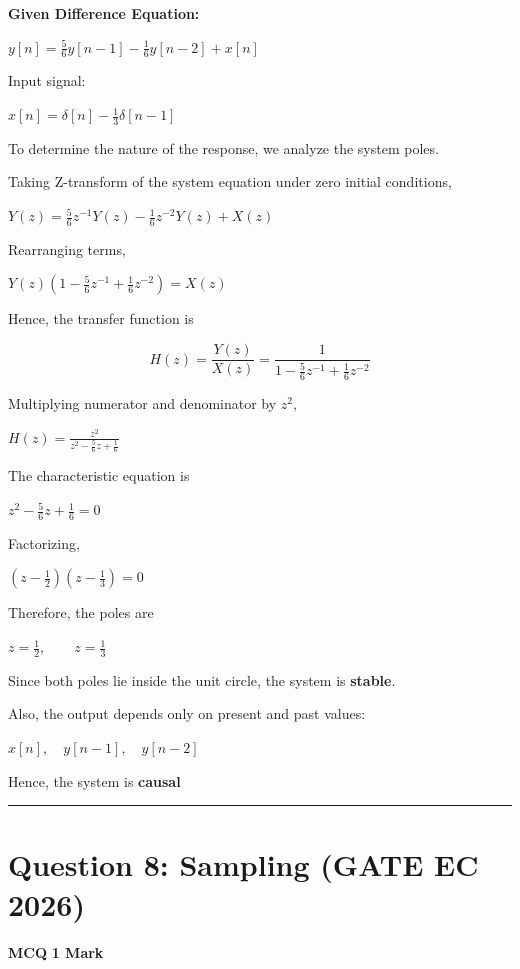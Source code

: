\documentclass[11pt,a4paper]{article}
\begin{document}
\begin{tcolorbox}[solbox, title=Detailed Solution -- Question 7]
\textbf{Given Difference Equation:}

$y[n]=\frac{5}{6}y[n-1]-\frac{1}{6}y[n-2]+x[n]$

Input signal:

$x[n]=\delta[n]-\frac{1}{3}\delta[n-1]$

To determine the nature of the response, we analyze the system poles.

Taking Z-transform of the system equation under zero initial conditions,

$Y(z)=\frac{5}{6}z^{-1}Y(z)-\frac{1}{6}z^{-2}Y(z)+X(z)$

Rearranging terms,

$Y(z)\left(1-\frac{5}{6}z^{-1}+\frac{1}{6}z^{-2}\right)=X(z)$

Hence, the transfer function is

\[
H(z)=\frac{Y(z)}{X(z)}
=
\frac{1}{1-\frac{5}{6}z^{-1}+\frac{1}{6}z^{-2}}
\]

Multiplying numerator and denominator by $z^2$,

$H(z)=\frac{z^2}{z^2-\frac{5}{6}z+\frac{1}{6}}$

The characteristic equation is

$z^2-\frac{5}{6}z+\frac{1}{6}=0$

Factorizing,

$\left(z-\frac{1}{2}\right)\left(z-\frac{1}{3}\right)=0$

Therefore, the poles are

$z=\frac{1}{2}, \qquad z=\frac{1}{3}$

Since both poles lie inside the unit circle, the system is \textbf{stable}.

Also, the output depends only on present and past values:

$x[n],\quad y[n-1],\quad y[n-2]$

Hence, the system is \textbf{causal}
\end{tcolorbox}

\vspace{1.5em}
\hrule
\vspace{1.5em}

\section*{Question 8: Sampling (GATE EC 2026)}
\noindent \textbf{\color{primary}MCQ} \hfill \textbf{\color{secondary}1 Mark}
\end{document}
